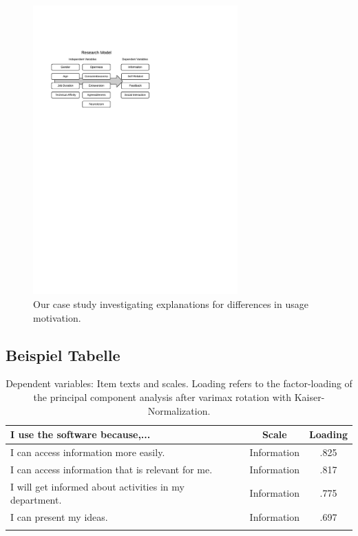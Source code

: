 \begin{figure}[htbp]
\centering
  \includegraphics[width=0.7\textwidth]{researchmodel.pdf}
   \caption{Our case study investigating explanations for differences in usage motivation.}
\label{fig:researchmodel}
\end{figure}

\subsection{Beispiel Tabelle}


\begin{table}[htbp]
\centering
	\begin{tabular}{p{7.7cm}p{0.5cm}cc}
	\toprule
	\textbf{I use the software because,...} &	&	\textbf{Scale} & Loading\\
	\midrule 
    I can access information more easily. & & Information & .825\\
    I can access information that is relevant for me.& & Information  & .817\\
    I will get informed about activities in my department. & & Information & .775 \\
    I can present my ideas. & & Information & .697 \\
	\bottomrule \\
\end{tabular}
\caption{Dependent variables: Item texts and scales. Loading refers to the factor-loading of the principal component analysis after varimax rotation with Kaiser-Normalization.}
\label{tab:ScalesMotives}
\end{table}

